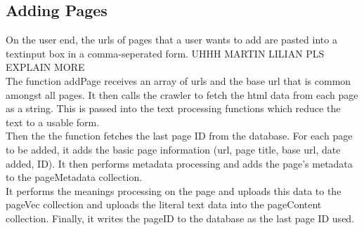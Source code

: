 \subsection{Adding Pages}
On the user end, the urls of pages that a user wants to add are pasted into a textinput box in a comma-seperated form. UHHH MARTIN LILIAN PLS EXPLAIN MORE \\

The function addPage receives an array of urls and the base url that is common amongst all pages. It then calls the crawler to fetch the html data from each page as a string. This is passed into the text processing functions which reduce the text to a usable form. \\
Then the the function fetches the last page ID from the database. For each page to be added, it adds the basic page information (url, page title, base url, date added, ID). It then performs metadata processing and adds the page's metadata to the pageMetadata collection. \\
It performs the meanings processing on the page and uploads this data to the pageVec collection and uploads the literal text data into the pageContent collection. Finally, it writes the pageID to the database as the last page ID used.
